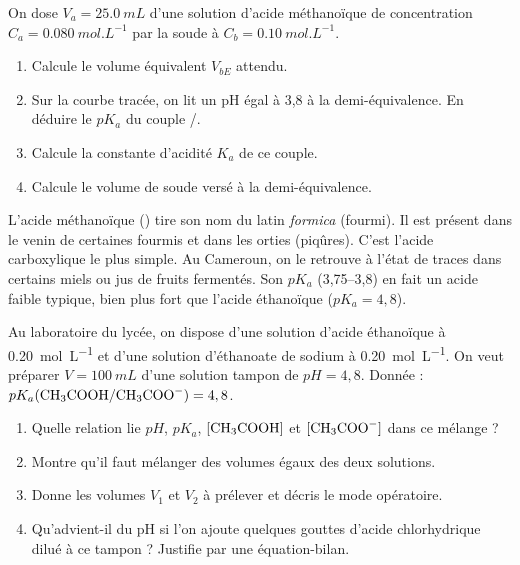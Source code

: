 \documentclass[11pt]{article}
\begin{document}
\begin{exercice}[Détermination d'un $pK_a$]
On dose $V_a = \SI{25,0}{mL}$ d'une solution d'acide méthanoïque  de concentration $C_a = \SI{0,080}{mol.L^{-1}}$ par la soude à $C_b = \SI{0,10}{mol.L^{-1}}$.
\begin{enumerate}
\item Calcule le volume équivalent $V_{bE}$ attendu.
\item Sur la courbe tracée, on lit un pH égal à 3,8 à la demi-équivalence. En déduire le $pK_a$ du couple /.
\item Calcule la constante d'acidité $K_a$ de ce couple.
\item Calcule le volume de soude versé à la demi-équivalence.
\end{enumerate}
\end{exercice}

\begin{savaistu}
L'acide méthanoïque () tire son nom du latin \emph{formica} (fourmi). Il est présent dans le venin de certaines fourmis et dans les orties (piqûres). C'est l'acide carboxylique le plus simple. Au Cameroun, on le retrouve à l'état de traces dans certains miels ou jus de fruits fermentés. Son $pK_a$ (3,75--3,8) en fait un acide faible typique, bien plus fort que l'acide éthanoïque ($pK_a=4,8$).
\end{savaistu}

\begin{exercice}
Au laboratoire du lycée, on dispose d'une solution d'acide éthanoïque  à \SI{0,20}{mol.L^{-1}} et d'une solution d'éthanoate de sodium  à \SI{0,20}{mol.L^{-1}}. On veut préparer $V = \SI{100}{mL}$ d'une solution tampon de $pH = 4,8$. Donnée : $pK_a(\ce{CH3COOH}/\ce{CH3COO-}) = 4,8$.
\begin{enumerate}
\item Quelle relation lie $pH$, $pK_a$, $[\ce{CH3COOH}]$ et $[\ce{CH3COO-}]$ dans ce mélange ?
\item Montre qu'il faut mélanger des volumes égaux des deux solutions.
\item Donne les volumes $V_1$ et $V_2$ à prélever et décris le mode opératoire.
\item Qu'advient-il du pH si l'on ajoute quelques gouttes d'acide chlorhydrique dilué à ce tampon ? Justifie par une équation-bilan.
\end{enumerate}
\end{exercice}
\end{document}
